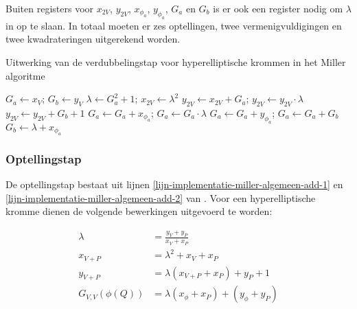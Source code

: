 Buiten registers voor $x_{2V}$, $y_{2V}$, $x_{\phi_a}$, $y_{\phi_a}$, $G_a$ en $G_b$ is er ook een register nodig om $\lambda$ in op te slaan. In totaal moeten er zes optellingen, twee vermenigvuldigingen en twee kwadrateringen uitgerekend worden.


\begin{algorithm}[h]
	\caption{Uitwerking van de verdubbelingstap voor hyperelliptische krommen in het Miller algoritme}
	\label{algoritme-implementatie-miller-double-detail}
	$G_a \leftarrow x_V$; $G_b \leftarrow y_V$\;
	$\lambda \leftarrow G_a^2 + 1$; $x_{2V} \leftarrow \lambda ^2$\;
	$y_{2V} \leftarrow x_{2V} + G_a$; $y_{2V} \leftarrow y_{2V} \cdot \lambda$\;
	$y_{2V} \leftarrow y_{2V} + G_b + 1$\;
	$G_a \leftarrow G_a + x_{\phi_a}$; $G_a \leftarrow G_a \cdot \lambda$\;
	$G_a \leftarrow G_a + y_{\phi_a}$; $G_a \leftarrow G_a + G_b$\;
	$G_b \leftarrow \lambda + x_{\phi_a}$\;
\end{algorithm}

\subsubsection{Optellingstap}

De optellingstap bestaat uit lijnen \ref{lijn-implementatie-miller-algemeen-add-1} en \ref{lijn-implementatie-miller-algemeen-add-2} van . Voor een hyperelliptische kromme dienen de volgende bewerkingen uitgevoerd te worden\cite{bertoni}:

\[\begin{aligned}
	\lambda &= \frac{y_V + y_P}{x_V + x_P}\\
	x_{V + P} &= \lambda ^2 + x_V + x_P\\
	y_{V + P} &= \lambda (x_{V+P} + x_P) + y_P + 1\\
	G_{V,V}(\phi(Q)) &= \lambda (x_{\phi} + x_P) + (y_{\phi} + y_P)\\
\end{aligned}\]


